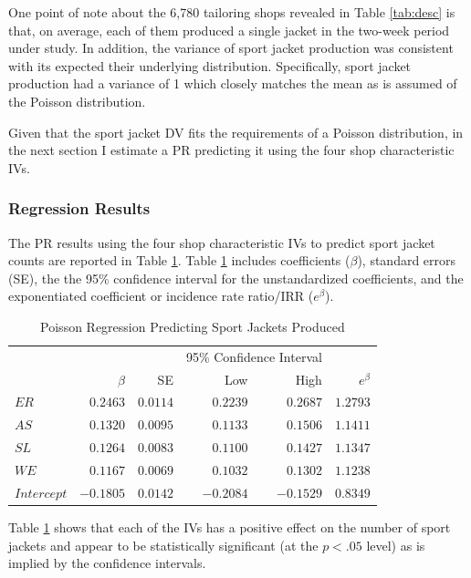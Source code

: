 \documentclass[ShortAfour,times,sageapa]{sagej}
\begin{document}
	One point of note about the 6,780 tailoring shops revealed in Table \ref{tab:desc} is that, on average, each of them produced a single jacket in the two-week period under study.
	In addition, the variance of sport jacket production was consistent with its expected their underlying distribution.
	Specifically, sport jacket production had a variance of 1 which closely matches the mean as is assumed of the Poisson distribution. 
	
	Given that the sport jacket DV fits the requirements of a Poisson distribution, in the next section I estimate a PR predicting it using the four shop characteristic IVs.

		\subsubsection{Regression Results}
		
	The PR results using the four shop characteristic IVs to predict sport jacket counts are reported in Table \ref{tab:poisreg}. 
	Table \ref{tab:poisreg} includes coefficients ($\beta$), standard errors (SE), the the 95\% confidence interval for the unstandardized coefficients, and the exponentiated coefficient or incidence rate ratio/IRR ($e^{\beta}$).
	
	\begin{table}[h!]
		\centering
		\caption{\centering Poisson Regression Predicting Sport Jackets Produced} 
		\begin{tabular}{l|rrrrr}
			\toprule
			\multicolumn{1}{l}{} &  &  & \multicolumn{2}{c}{95\% Confidence Interval} &   \\ 
			\cmidrule(lr){4-5}
			\multicolumn{1}{l}{} & $\beta$ & SE & Low & High & $e^{\beta}$ \\ 
			\midrule
			$ER$ & $0.2463$ & $0.0114$ & $0.2239$ & $0.2687$ & $1.2793$ \\ 
			$AS$ & $0.1320$ & $0.0095$ & $0.1133$ & $0.1506$ & $1.1411$ \\ 
			$SL$ & $0.1264$ & $0.0083$ & $0.1100$ & $0.1427$ & $1.1347$ \\ 
			$WE$ & $0.1167$ & $0.0069$ & $0.1032$ & $0.1302$ &  $1.1238$  \\ 
			$Intercept$ & $-0.1805$ & $0.0142$ & $-0.2084$ & $-0.1529$ & $0.8349$ \\
			\bottomrule
		\end{tabular}
		\label{tab:poisreg}
	\end{table}


	Table \ref{tab:poisreg} shows that each of the IVs has a positive effect on the number of sport jackets and appear to be statistically significant (at the $p < .05$ level) as is implied by the confidence intervals.
	
\end{document}
